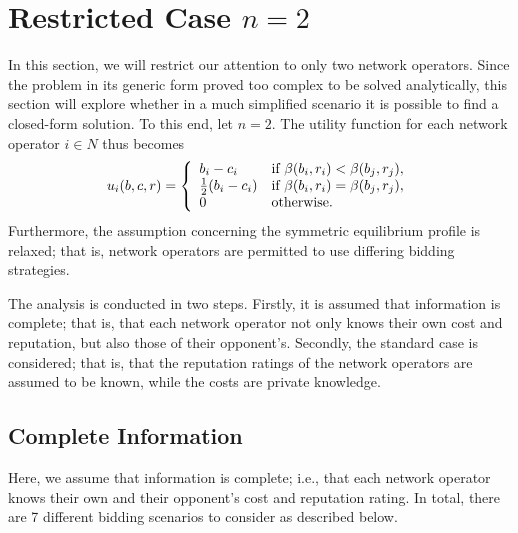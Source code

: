 \section{Restricted Case $n=2$} %
\label{sec:direct_restricted_case_n_2_direct}
In this section, we will restrict our attention to only two network operators. Since the problem in its generic form proved too complex to be solved analytically, this section will explore whether in a much simplified scenario it is possible to find a closed-form solution. To this end, let $n=2$. The utility function for each network operator $i\in N$ thus becomes
\begin{equation}
	\label{eq:utility_n_2_direct}
	u_i(b,c,r) = \left\{
	\begin{array}{l l}
		b_i - c_i &\text{if } \beta(b_i,r_i) < \beta(b_j,r_j),\\
		\frac{1}{2}(b_i - c_i) &\text{if } \beta(b_i,r_i) = \beta(b_j,r_j),\\
		0 &\text{otherwise}.
	\end{array}\right.
\end{equation}
Furthermore, the assumption concerning the symmetric equilibrium profile is relaxed; that is, network operators are permitted to use differing bidding strategies.

The analysis is conducted in two steps. Firstly, it is assumed that information is complete; that is, that each network operator not only knows their own cost and reputation, but also those of their opponent's. Secondly, the standard case is considered; that is, that the reputation ratings of the network operators are assumed to be known, while the costs are private knowledge.

\subsection{Complete Information} %
\label{sub:complete_information_n_2_direct}
Here, we assume that information is complete; i.e., that each network operator knows their own and their opponent's cost and reputation rating. In total, there are 7 different bidding scenarios to consider as described below.

